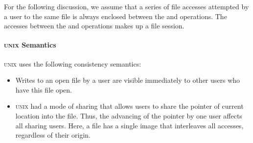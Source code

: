 For the following discussion, we assume that a series of file accesses attempted by a user to the same file is always enclosed between the  and  operations.
The accesses between the  and  operations makes up a file session.

\paragraph{\textsc{unix} Semantics}\label{par:UNIX_Consistency_Semantics}
\textsc{unix} uses the following consistency semantics:
\begin{itemize}[noitemsep]
\item Writes to an open file by a user are visible immediately to other users who have this file open.
\item \textsc{unix} had a mode of sharing that allows users to share the pointer of current location into the file.
  Thus, the advancing of the pointer by one user affects all sharing users.
  Here, a file has a single image that interleaves all accesses, regardless of their origin.
\end{itemize}


